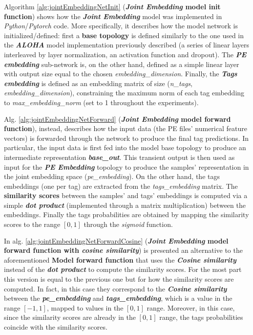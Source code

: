 \documentclass[pdfa%
,cucitura%
]{toptesi}
\begin{document}
Algorithm \ref{alg:jointEmbeddingNetInit} (\textbf{\textit{Joint Embedding} model init function}) shows how the \textbf{\textit{Joint Embedding}} model was implemented in \textit{Python}/\textit{Pytorch} code. More specifically, it describes how the model network is initialized/defined: first a \textbf{base topology} is defined similarly to the one used in the \textbf{\textit{ALOHA}} model implementation previously described (a series of linear layers interleaved by layer normalization, an activation function and dropout). The \textbf{\textit{PE embedding}} sub-network is, on the other hand, defined as a simple linear layer with output size equal to the chosen \textit{embedding\_dimension}. Finally, the \textbf{\textit{Tags embedding}} is defined as an embedding matrix of size (\textit{n\_tags}, \textit{embedding\_dimension}), constraining the maximum norm of each tag embedding to \textit{max\_embedding\_norm} (set to 1 throughout the experiments).

Alg. \ref{alg:jointEmbeddingNetForward} (\textbf{\textit{Joint Embedding} model forward function}), instead, describes how the input data (the PE files' numerical feature vectors) is forwarded through the network to produce the final tag predictions. In particular, the input data is first fed into the model base topology to produce an intermediate representation \textbf{\textit{base\_out}}. This transient output is then used as input for the \textbf{\textit{PE Embedding}} topology to produce the samples' representation in the joint embedding space (\textit{pe\_embedding}). On the other hand, the tags embeddings (one per tag) are extracted from the \textit{tags\_embedding} matrix. The \textbf{similarity scores} between the samples' and tags' embeddings is computed via a simple \textbf{\textit{dot product}} (implemented through a matrix multiplication) between the embeddings. Finally the tags probabilities are obtained by mapping the similarity scores to the range $[0,1]$ through the \textit{sigmoid} function.

In alg. \ref{alg:jointEmbeddingNetForwardCosine} (\textbf{\textit{Joint Embedding} model forward function with \textit{cosine similarity}}) is presented an alternative to the aforementioned \textbf{Model forward function} that uses the \textbf{\textit{Cosine similarity}} instead of the \textbf{\textit{dot product}} to compute the similarity scores. For the most part this version is equal to the previous one but for how the similarity scores are computed. In fact, in this case they correspond to the \textbf{\textit{Cosine similarity}} between the \textbf{\textit{pe\_embedding}} and \textbf{\textit{tags\_embedding}}, which is a value in the range $[-1, 1]$, mapped to values in the $[0, 1]$ range. Moreover, in this case, since the similarity scores are already in the $[0, 1]$ range, the tags probabilities coincide with the similarity scores.
\end{document}
